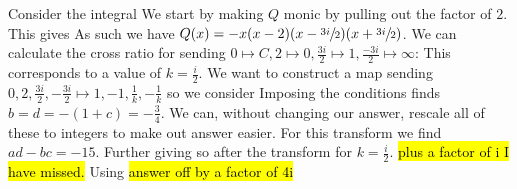 \documentclass{article}
\begin{document}
\begin{example}
	Consider the integral 
We start by making $Q$ monic by pulling out the factor of $2$. This gives 
As such we have $Q(x) = -x(x-2)(x-\sfrac{3i}{2})(x+\sfrac{3i}{2})$. We can  calculate the cross ratio for sending $0 \mapsto C, 2 \mapsto 0, \frac{3i}{2} \mapsto 1, \frac{-3i}{2}\mapsto \infty$:
This corresponds to a value of $k=\frac{i}{2}$. We want to construct a map sending $0,2,\frac{3i}{2},-\frac{3i}{2} \mapsto 1,-1,\frac{1}{k}, -\frac{1}{k}$ so we consider 
Imposing the conditions finds $b=d=-(1+c) = -\frac{3}{4}$. We can, without changing our answer, rescale all of these to integers to make out answer easier. For this transform we find $ad-bc=-15$. Further
giving 
so after the transform 
for $k=\frac{i}{2}$. \hl{plus a factor of i I have missed.} Using 
\hl{answer off by a factor of 4i}
\end{example}
	


\end{document}

